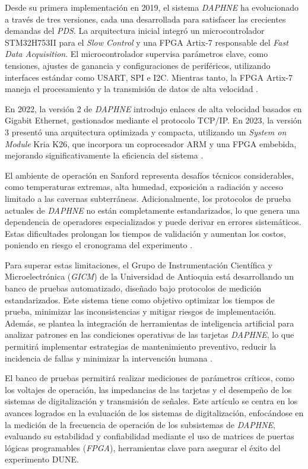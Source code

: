Desde su primera implementación en 2019, el sistema \textit{DAPHNE} ha evolucionado a través de tres versiones, cada una desarrollada para satisfacer las crecientes demandas del \textit{PDS}. La arquitectura inicial integró un microcontrolador STM32H753II para el \textit{Slow Control} y una FPGA Artix-7 responsable del \textit{Fast Data Acquisition}. El microcontrolador supervisa parámetros clave, como tensiones, ajustes de ganancia y configuraciones de periféricos, utilizando interfaces estándar como USART, SPI e I2C. Mientras tanto, la FPGA Artix-7 maneja el procesamiento y la transmisión de datos de alta velocidad \cite{STM32H753II}. 

En 2022, la versión 2 de \textit{DAPHNE} introdujo enlaces de alta velocidad basados en Gigabit Ethernet, gestionados mediante el protocolo TCP/IP. En 2023, la versión 3 presentó una arquitectura optimizada y compacta, utilizando un \textit{System on Module} Kria K26, que incorpora un coprocesador ARM y una FPGA embebida, mejorando significativamente la eficiencia del sistema \cite{DUNE_Far_Detector}. 

El ambiente de operación en Sanford representa desafíos técnicos considerables, como temperaturas extremas, alta humedad, exposición a radiación y acceso limitado a las cavernas subterráneas. Adicionalmente, los protocolos de prueba actuales de \textit{DAPHNE} no están completamente estandarizados, lo que genera una dependencia de operadores especializados y puede derivar en errores sistemáticos. Estas dificultades prolongan los tiempos de validación y aumentan los costos, poniendo en riesgo el cronograma del experimento \cite{Esteban_Ferrer}.

Para superar estas limitaciones, el Grupo de Instrumentación Científica y Microelectrónica (\textit{GICM}) de la Universidad de Antioquia está desarrollando un banco de pruebas automatizado, diseñado bajo protocolos de medición estandarizados. Este sistema tiene como objetivo optimizar los tiempos de prueba, minimizar las inconsistencias y mitigar riesgos de implementación. Además, se plantea la integración de herramientas de inteligencia artificial para analizar patrones en las condiciones operativas de las tarjetas \textit{DAPHNE}, lo que permitirá implementar estrategias de mantenimiento preventivo, reducir la incidencia de fallas y minimizar la intervención humana  \cite{GICMDevelopment2023}.

El banco de pruebas permitirá realizar mediciones de parámetros críticos, como los voltajes de operación, las impedancias de las tarjetas y el desempeño de los sistemas de digitalización y transmisión de señales. Este artículo se centra en los avances logrados en la evaluación de los sistemas de digitalización, enfocándose en la medición de la frecuencia de operación de los subsistemas de \textit{DAPHNE}, evaluando su estabilidad y confiabilidad mediante el uso de matrices de puertas lógicas programables (\textit{FPGA}), herramientas clave para asegurar el éxito del experimento DUNE.